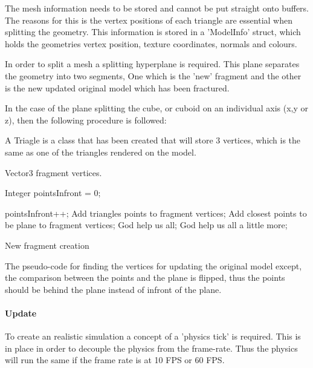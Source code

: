 \documentclass[conference,backref=page]{acmsiggraph}
\begin{document}
The mesh information needs to be stored and cannot be put straight onto buffers. The reasons for this is the vertex positions of each triangle are essential when splitting the geometry. This information is stored in a 'ModelInfo' struct, which holds the geometries vertex position, texture coordinates, normals and colours.
 
In order to split a mesh a splitting hyperplane is required. This plane separates the geometry into two segments, One which is the 'new' fragment and the other is the new updated original model which has been fractured. 

In the case of the plane splitting the cube, or cuboid on an individual axis (x,y or z), then the following procedure is followed:

A Triagle is a class that has been created that will store 3 vertices, which is the same as one of the triangles rendered on the model.

\begin{algorithm}
Vector3 fragment vertices.  \hfill

{
		Integer pointsInfront = 0; \hfill 
		
		{
			{
				pointsInfront++;
			}
		}
	{
		Add triangles points to fragment vertices;
	}
	{
		Add closest points to be plane to fragment vertices;
	}
	{
		God help us all;
	}
	{
		God help us all a little more;
	}
}
 \caption{New fragment creation}
\end{algorithm}

 The pseudo-code for finding the vertices for updating the original model except, the comparison between the points and the plane is flipped, thus the points should be behind the plane instead of infront of the plane.




\paragraph{Update} \hfill

To create an realistic simulation a concept of a 'physics tick' is required. This is in place in order to decouple the physics from the frame-rate. Thus the physics will run the same if the frame rate is at 10 FPS or 60 FPS.  
\end{document}
